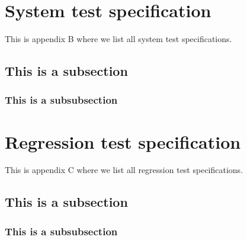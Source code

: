 \documentclass[a4paper]{article}
\begin{document}
\begin{appendices}

\newpage

\section{System test specification} \label{appendix:section:systemtest}
This is appendix B where we list all system test specifications.

\subsection{This is a subsection}

\subsubsection{This is a subsubsection}


\newpage
\section{Regression test specification}
This is appendix C where we list all regression test specifications.

\subsection{This is a subsection}

\subsubsection{This is a subsubsection}
\end{appendices}
\end{document}
